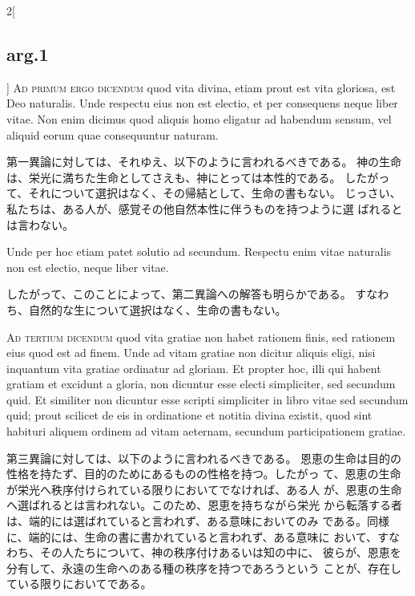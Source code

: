 \documentclass[paper=a4paper,fontsize=10pt,jafontsize=9pt,titlepage]{jlreq}
\begin{document}
\begin{paracol}{2}[\subsection{arg.1}]
{\scshape Ad primum ergo dicendum} quod vita divina,
 etiam prout est vita gloriosa, est Deo naturalis. Unde respectu eius
 non est electio, et per consequens neque liber vitae. Non enim dicimus
 quod aliquis homo eligatur ad habendum sensum, vel aliquid eorum quae
 consequuntur naturam.

\switchcolumn

第一異論に対しては、それゆえ、以下のように言われるべきである。
神の生命は、栄光に満ちた生命としてさえも、神にとっては本性的である。
したがって、それについて選択はなく、その帰結として、生命の書もない。
じっさい、私たちは、ある人が、感覚その他自然本性に伴うものを持つように選
 ばれるとは言わない。

\switchcolumn*[\subsection{ad.2}]

Unde per hoc etiam patet solutio ad
 secundum. Respectu enim vitae naturalis non est electio, neque liber
 vitae.

\switchcolumn

したがって、このことによって、第二異論への解答も明らかである。
すなわち、自然的な生について選択はなく、生命の書もない。

\switchcolumn*[\subsection{ad.3}]

{\scshape Ad tertium dicendum} quod vita gratiae non
 habet rationem finis, sed rationem eius quod est ad finem. Unde ad
 vitam gratiae non dicitur aliquis eligi, nisi inquantum vita gratiae
 ordinatur ad gloriam. Et propter hoc, illi qui habent gratiam et
 excidunt a gloria, non dicuntur esse electi simpliciter, sed secundum
 quid. Et similiter non dicuntur esse scripti simpliciter in libro vitae
 sed secundum quid; prout scilicet de eis in ordinatione et notitia
 divina existit, quod sint habituri aliquem ordinem ad vitam aeternam,
 secundum participationem gratiae.

\switchcolumn

第三異論に対しては、以下のように言われるべきである。
恩恵の生命は目的の性格を持たず、目的のためにあるものの性格を持つ。したがっ
 て、恩恵の生命が栄光へ秩序付けられている限りにおいてでなければ、ある人
 が、恩恵の生命へ選ばれるとは言われない。このため、恩恵を持ちながら栄光
 から転落する者は、端的には選ばれていると言われず、ある意味においてのみ
 である。同様に、端的には、生命の書に書かれていると言われず、ある意味に
 おいて、すなわち、その人たちについて、神の秩序付けあるいは知の中に、
 彼らが、恩恵を分有して、永遠の生命へのある種の秩序を持つであろうという
 ことが、存在している限りにおいてである。


\end{paracol}
\newpage
{}
{}
\setcounter{section}{3}
\setcounter{subsection}{0}
\end{document}
